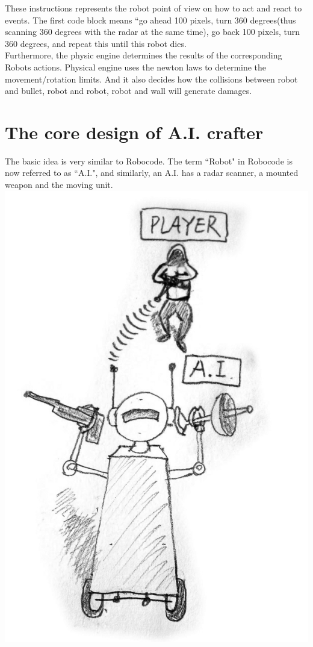 \documentclass[12pt]{article}
\begin{document}
These instructions represents the robot point of view on how to act and react to events. The first code block means ``go ahead 100 pixels, turn 360 degrees(thus scanning 360 degrees with the radar at the same time), go back 100 pixels, turn 360 degrees, and repeat this until this robot dies.\\ 

Furthermore, the physic engine determines the results of the corresponding Robots actions. Physical engine uses the newton laws to determine the movement/rotation limits. And it also decides how the collisions between robot and bullet, robot and robot, robot and wall will generate damages.\\

\section{The core design of A.I. crafter}
The basic idea is very similar to Robocode. The term ``Robot" in Robocode is now referred to as ``A.I.", and similarly, an A.I. has a radar scanner, a mounted weapon and the moving unit.\\ 

\includegraphics[scale=0.3]{design_draft_1.jpg}\\
\end{document}
